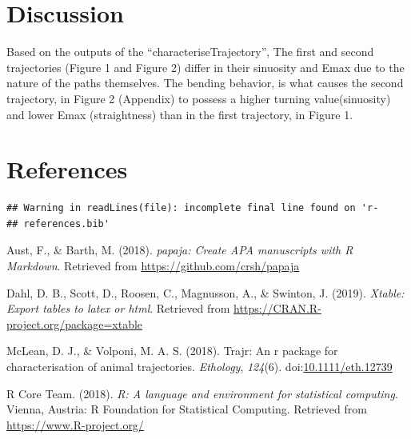 \documentclass[man]{apa6}
\begin{document}
\section{Discussion}\label{discussion}

Based on the outputs of the \enquote{characteriseTrajectory}, The first
and second trajectories (Figure 1 and Figure 2) differ in their
sinuosity and Emax due to the nature of the paths themselves. The
bending behavior, is what causes the second trajectory, in Figure 2
(Appendix) to possess a higher turning value(sinuosity) and lower Emax
(straightness) than in the first trajectory, in Figure 1.

\newpage

\section{References}\label{references}

\begin{verbatim}
## Warning in readLines(file): incomplete final line found on 'r-
## references.bib'
\end{verbatim}

\begingroup
\setlength{\parindent}{-0.5in} \setlength{\leftskip}{0.5in}

\hypertarget{refs}{}
\hypertarget{ref-R-papaja}{}
Aust, F., \& Barth, M. (2018). \emph{papaja: Create APA manuscripts with
R Markdown}. Retrieved from \url{https://github.com/crsh/papaja}

\hypertarget{ref-R-xtable}{}
Dahl, D. B., Scott, D., Roosen, C., Magnusson, A., \& Swinton, J.
(2019). \emph{Xtable: Export tables to latex or html}. Retrieved from
\url{https://CRAN.R-project.org/package=xtable}

\hypertarget{ref-Mclean2018}{}
McLean, D. J., \& Volponi, M. A. S. (2018). Trajr: An r package for
characterisation of animal trajectories. \emph{Ethology}, \emph{124}(6).
doi:\href{https://doi.org/10.1111/eth.12739}{10.1111/eth.12739}

\hypertarget{ref-R-base}{}
R Core Team. (2018). \emph{R: A language and environment for statistical
computing}. Vienna, Austria: R Foundation for Statistical Computing.
Retrieved from \url{https://www.R-project.org/}

\endgroup
\end{document}
